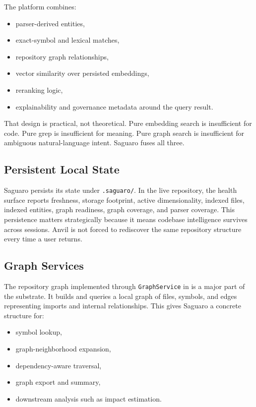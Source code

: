 \documentclass[11pt,a4paper]{article}
\begin{document}
The platform combines:
\begin{itemize}
    \item parser-derived entities,
    \item exact-symbol and lexical matches,
    \item repository graph relationships,
    \item vector similarity over persisted embeddings,
    \item reranking logic,
    \item explainability and governance metadata around the query result.
\end{itemize}

That design is practical, not theoretical. Pure embedding search is insufficient for code. Pure grep is insufficient for meaning. Pure graph search is insufficient for ambiguous natural-language intent. Saguaro fuses all three.

\subsection{Persistent Local State}
Saguaro persists its state under \texttt{.saguaro/}. In the live repository, the health surface reports freshness, storage footprint, active dimensionality, indexed files, indexed entities, graph readiness, graph coverage, and parser coverage. This persistence matters strategically because it means codebase intelligence survives across sessions. Anvil is not forced to rediscover the same repository structure every time a user returns.

\subsection{Graph Services}
The repository graph implemented through \texttt{GraphService} in  is a major part of the substrate. It builds and queries a local graph of files, symbols, and edges representing imports and internal relationships. This gives Saguaro a concrete structure for:
\begin{itemize}
    \item symbol lookup,
    \item graph-neighborhood expansion,
    \item dependency-aware traversal,
    \item graph export and summary,
    \item downstream analysis such as impact estimation.
\end{itemize}
\end{document}

